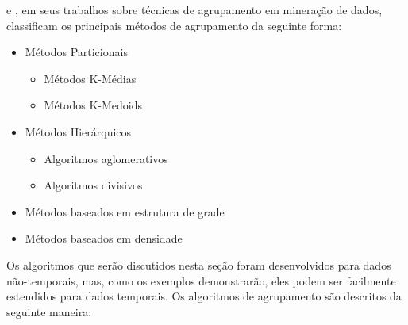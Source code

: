  e , em seus trabalhos sobre técnicas de agrupamento em mineração de dados, classificam os principais métodos de agrupamento da seguinte forma:
\begin{itemize}
	\item Métodos Particionais
	\begin{itemize}
      \item Métodos K-Médias
      \item Métodos K-Medoids
    \end{itemize}
	\item Métodos Hierárquicos
	\begin{itemize}
      \item Algoritmos aglomerativos
      \item Algoritmos divisivos
    \end{itemize}
	\item Métodos baseados em estrutura de grade
	\item Métodos baseados em densidade
\end{itemize}


Os algoritmos que serão discutidos nesta seção foram desenvolvidos para dados não-temporais, mas, como os exemplos demonstrarão, eles podem ser facilmente estendidos para dados temporais. Os algoritmos de agrupamento são descritos da seguinte maneira:

